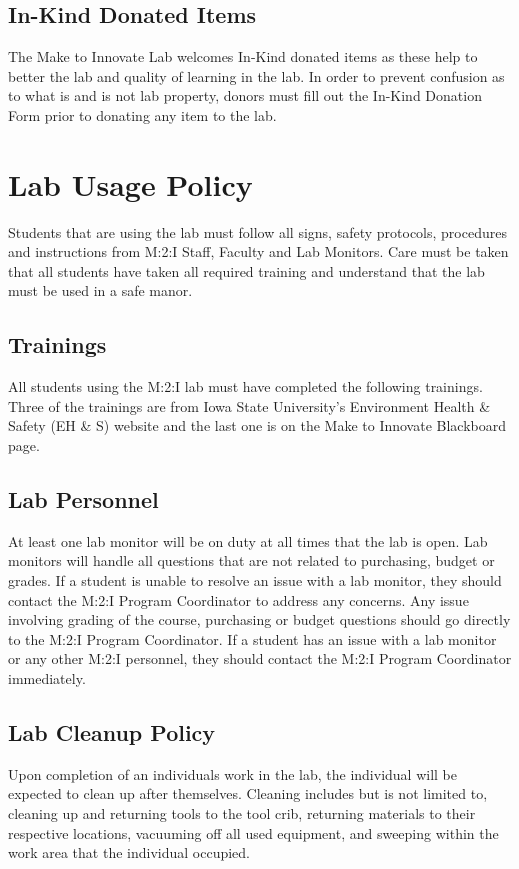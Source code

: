 \subsection{In-Kind Donated Items}
The Make to Innovate Lab welcomes In-Kind donated items as these help to better the lab and quality of learning in the lab. In order to prevent confusion as to what is and is not lab property, donors must fill out the In-Kind Donation Form prior to donating any item to the lab.

\section{Lab Usage Policy}
Students that are using the lab must follow all signs, safety protocols, procedures and instructions from M:2:I Staff, Faculty and Lab Monitors.  Care must be taken that all students have taken all required training and understand that the lab must be used in a safe manor.  

\subsection{Trainings}
All students using the M:2:I lab must have completed the following trainings.  Three of the trainings are from Iowa State University's Environment Health \& Safety (EH \& S) website and the last one is on the Make to Innovate Blackboard page.

\subsection{Lab Personnel}
At least one lab monitor will be on duty at all times that the lab is open. Lab monitors will handle all questions that are not related to purchasing, budget or grades. If a student is unable to resolve an issue with a lab monitor, they should contact the M:2:I Program Coordinator to address any concerns.  Any issue involving grading of the course, purchasing or budget questions should go directly to the M:2:I Program Coordinator.  If a student has an issue with a lab monitor or any other M:2:I personnel, they should contact the M:2:I Program Coordinator immediately.  

\subsection{Lab Cleanup Policy}
Upon completion of an individuals work in the lab, the individual will be expected to clean up after themselves. Cleaning includes but is not limited to, cleaning up and returning tools to the tool crib, returning materials to their respective locations, vacuuming off all used equipment, and sweeping within the work area that the individual occupied.
